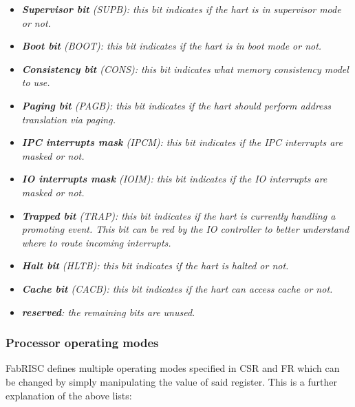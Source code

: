 \begin{itemize}
                \item \textit{\textbf{Supervisor bit} (SUPB): this bit indicates if the hart is in supervisor mode or not.}

                \item \textit{\textbf{Boot bit} (BOOT): this bit indicates if the hart is in boot mode or not.}

                \item \textit{\textbf{Consistency bit} (CONS): this bit indicates what memory consistency model to use.}

                \item \textit{\textbf{Paging bit} (PAGB): this bit indicates if the hart should perform address translation via paging.}

                \item \textit{\textbf{IPC interrupts mask} (IPCM): this bit indicates if the IPC interrupts are masked or not.}

                \item \textit{\textbf{IO interrupts mask} (IOIM): this bit indicates if the IO interrupts are masked or not.}

                \item \textit{\textbf{Trapped bit} (TRAP): this bit indicates if the hart is currently handling a promoting event. This bit can be red by the IO controller to better understand where to route incoming interrupts.}

                \item \textit{\textbf{Halt bit} (HLTB): this bit indicates if the hart is halted or not.}

                \item \textit{\textbf{Cache bit} (CACB): this bit indicates if the hart can access cache or not.}

                \item \textit{\textbf{reserved}: the remaining bits are unused.}

            \end{itemize}

        \subsubsection{Processor operating modes}

            \vspace{10pt}

            FabRISC defines multiple operating modes specified in CSR and FR which can be changed by simply manipulating the value of said register. This is a further explanation of the above lists:

